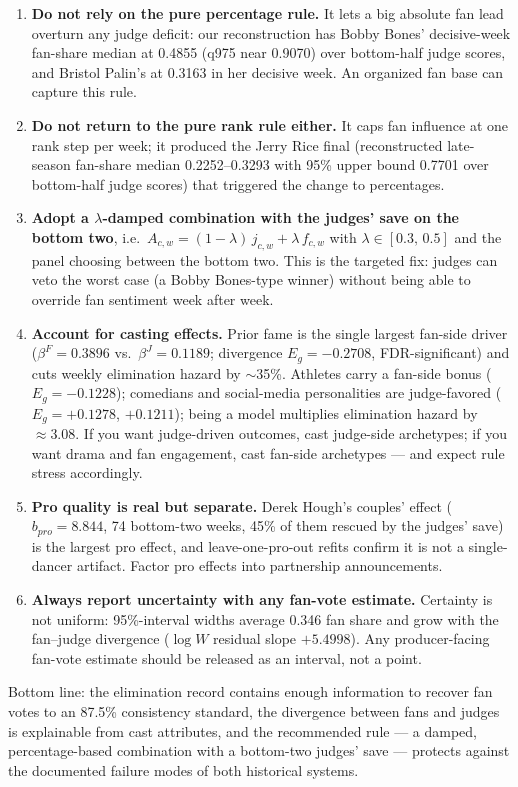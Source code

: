 \begin{enumerate}
\item \textbf{Do not rely on the pure percentage rule.} It lets a big absolute fan
lead overturn any judge deficit: our reconstruction has Bobby Bones' decisive-week
fan-share median at 0.4855 (q975 near 0.9070) over bottom-half judge scores, and
Bristol Palin's at 0.3163 in her decisive week. An organized fan base can capture
this rule.
\item \textbf{Do not return to the pure rank rule either.} It caps fan influence at
one rank step per week; it produced the Jerry Rice final (reconstructed late-season
fan-share median 0.2252--0.3293 with 95\% upper bound 0.7701 over bottom-half judge
scores) that triggered the change to percentages.
\item \textbf{Adopt a $\lambda$-damped combination with the judges' save on the
bottom two}, i.e.\ $A_{c,w} = (1-\lambda)\,j_{c,w} + \lambda\,f_{c,w}$ with
$\lambda \in [0.3,\,0.5]$ and the panel choosing between the bottom two. This is the
targeted fix: judges can veto the worst case (a Bobby Bones-type winner) without
being able to override fan sentiment week after week.
\item \textbf{Account for casting effects.} Prior fame is the single largest
fan-side driver ($\beta^F = 0.3896$ vs.\ $\beta^J = 0.1189$; divergence
$E_g = -0.2708$, FDR-significant) and cuts weekly elimination hazard by $\sim$35\%.
Athletes carry a fan-side bonus ($E_g = -0.1228$); comedians and social-media
personalities are judge-favored ($E_g = +0.1278$, $+0.1211$); being a model
multiplies elimination hazard by $\approx 3.08$. If you want judge-driven outcomes,
cast judge-side archetypes; if you want drama and fan engagement, cast fan-side
archetypes --- and expect rule stress accordingly.
\item \textbf{Pro quality is real but separate.} Derek Hough's couples' effect
($b_{pro} = 8.844$, 74 bottom-two weeks, 45\% of them rescued by the judges' save)
is the largest pro effect, and leave-one-pro-out refits confirm it is not a
single-dancer artifact. Factor pro effects into partnership announcements.
\item \textbf{Always report uncertainty with any fan-vote estimate.} Certainty is
not uniform: 95\%-interval widths average 0.346 fan share and grow with the
fan--judge divergence ($\log W$ residual slope $+5.4998$). Any producer-facing
fan-vote estimate should be released as an interval, not a point.
\end{enumerate}

\noindent Bottom line: the elimination record contains enough information to recover
fan votes to an 87.5\% consistency standard, the divergence between fans and judges
is explainable from cast attributes, and the recommended rule --- a damped,
percentage-based combination with a bottom-two judges' save --- protects against
the documented failure modes of both historical systems.


